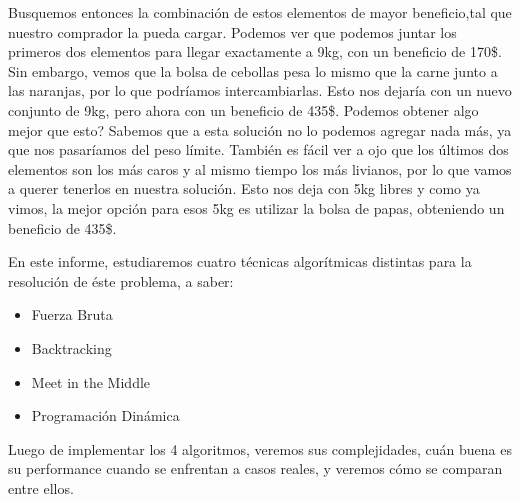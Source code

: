 Busquemos entonces la combinación de estos elementos de mayor beneficio,tal que nuestro comprador la pueda cargar. Podemos ver que podemos juntar los primeros dos elementos para llegar exactamente a 9kg, con un beneficio de 170\$. Sin embargo, vemos que la bolsa de cebollas pesa lo mismo que la carne junto a las naranjas, por lo que podríamos intercambiarlas. Esto nos dejaría con un nuevo conjunto de 9kg, pero ahora con un beneficio de 435\$. Podemos obtener algo mejor que esto? Sabemos que a esta solución no lo podemos agregar nada más, ya que nos pasaríamos del peso límite. También es fácil ver a ojo que los últimos dos elementos son los más caros y al mismo tiempo los más livianos, por lo que vamos a querer tenerlos en nuestra solución. Esto nos deja con 5kg libres y como ya vimos, la mejor opción para esos 5kg es utilizar la bolsa de papas, obteniendo un beneficio de 435\$.

En este informe, estudiaremos cuatro técnicas algorítmicas distintas para la resolución de éste problema, a saber:
\begin{itemize}
\item Fuerza Bruta
\item Backtracking
\item Meet in the Middle
\item Programación Dinámica
\end{itemize}

Luego de implementar los 4 algoritmos, veremos sus complejidades, cuán buena es su performance cuando se enfrentan a casos reales, y veremos cómo se comparan entre ellos.
\label{sec:introduccion}
